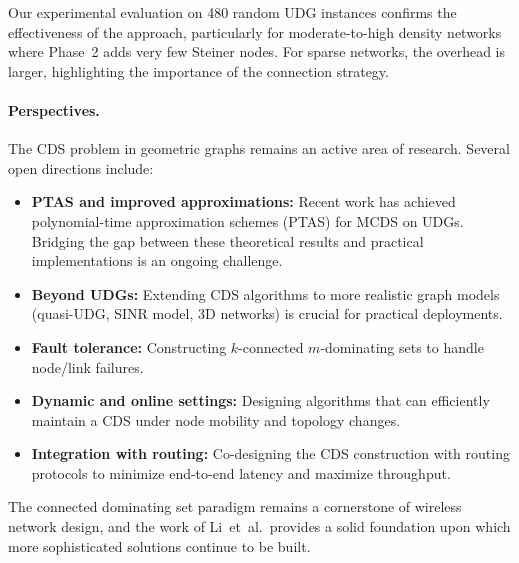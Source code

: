 \documentclass[11pt,a4paper]{article}
\begin{document}
Our experimental evaluation on 480 random UDG instances confirms the
effectiveness of the approach, particularly for moderate-to-high density
networks where Phase~2 adds very few Steiner nodes.  For sparse networks, the
overhead is larger, highlighting the importance of the connection strategy.

\paragraph{Perspectives.}
The CDS problem in geometric graphs remains an active area of research.
Several open directions include:

\begin{itemize}[nosep]
  \item \textbf{PTAS and improved approximations:} Recent work has achieved
        polynomial-time approximation schemes (PTAS) for MCDS on UDGs.
        Bridging the gap between these theoretical results and practical
        implementations is an ongoing challenge.
  \item \textbf{Beyond UDGs:} Extending CDS algorithms to more realistic
        graph models (quasi-UDG, SINR model, 3D networks) is crucial for
        practical deployments.
  \item \textbf{Fault tolerance:} Constructing $k$-connected $m$-dominating
        sets to handle node/link failures.
  \item \textbf{Dynamic and online settings:} Designing algorithms that can
        efficiently maintain a CDS under node mobility and topology changes.
  \item \textbf{Integration with routing:} Co-designing the CDS construction
        with routing protocols to minimize end-to-end latency and maximize
        throughput.
\end{itemize}

The connected dominating set paradigm remains a cornerstone of wireless network
design, and the work of Li~et~al.\ provides a solid foundation upon which more
sophisticated solutions continue to be built.
\end{document}
